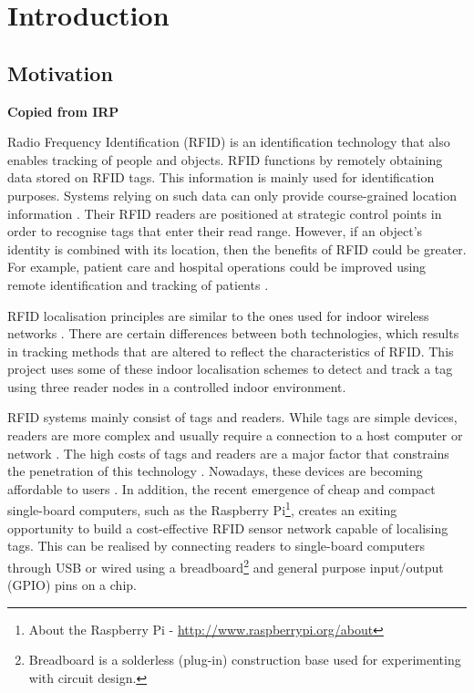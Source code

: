 \chapter{Introduction}
\label{ch:introduction}

\section{Motivation}

\textbf{Copied from IRP}

Radio Frequency Identification (RFID) is an identification technology that also enables tracking of people and objects. RFID functions by remotely obtaining data stored on RFID tags. This information is mainly used for identification purposes. Systems relying on such data can only provide course-grained location information \cite{Bouet2008}. Their RFID readers are positioned at strategic control points in order to recognise tags that enter their read range. However, if an object's identity is combined with its location, then the benefits of RFID could be greater. For example, patient care and hospital operations could be improved using remote identification and tracking of patients \cite{Cangialosi2007}.

RFID localisation principles are similar to the ones used for indoor wireless networks \cite{Bouet2008}. There are certain differences between both technologies, which results in tracking methods that are altered to reflect the characteristics of RFID. This project uses some of these indoor localisation schemes to detect and track a tag using three reader nodes in a controlled indoor environment. 

RFID systems mainly consist of tags and readers. While tags are simple devices, readers are more complex and usually require a connection to a host computer or network \cite{Landt2005}. The high costs of tags and readers are a major factor that constrains the penetration of this technology \cite{Want2006}. Nowadays, these devices are becoming affordable to users . In addition, the recent emergence of cheap and compact single-board computers, such as the Raspberry Pi\footnote{About the Raspberry Pi - \url{http://www.raspberrypi.org/about}}, creates an exiting opportunity to build a cost-effective RFID sensor network capable of localising tags. This can be realised by connecting readers to single-board computers through USB or wired using a breadboard\footnote{Breadboard is a solderless (plug-in) construction base used for experimenting with circuit design.} and general purpose input/output (GPIO) pins on a chip.

